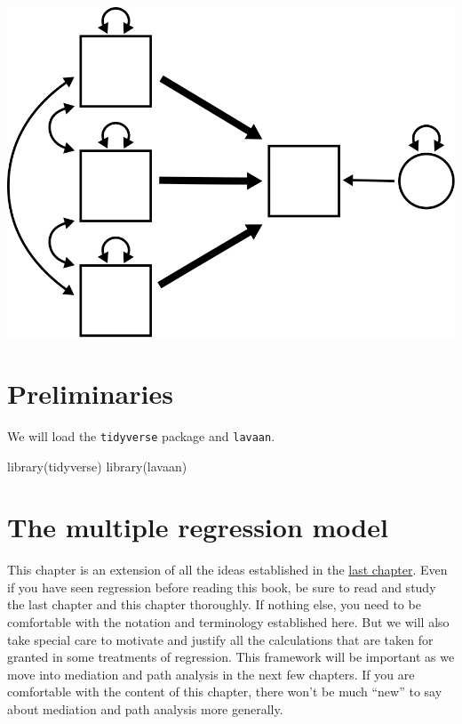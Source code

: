 \documentclass[
]{book}
\newenvironment{Shaded}{\begin{snugshade}}{\end{snugshade}}
\newcommand{\FunctionTok}[1]{\textcolor[rgb]{0.00,0.00,0.00}{#1}}
\newcommand{\NormalTok}[1]{#1}
\begin{document}
\begin{center}\includegraphics{graphics/multiple_regression} \end{center}

\hypertarget{preliminaries-1}{%
\section*{Preliminaries}\label{preliminaries-1}}

We will load the \texttt{tidyverse} package and \texttt{lavaan}.

\begin{Shaded}
\begin{Highlighting}[]
\FunctionTok{library}\NormalTok{(tidyverse)}
\FunctionTok{library}\NormalTok{(lavaan)}
\end{Highlighting}
\end{Shaded}

\hypertarget{multiple-model}{%
\section{The multiple regression model}\label{multiple-model}}

This chapter is an extension of all the ideas established in the \protect\hyperlink{simple}{last chapter}. Even if you have seen regression before reading this book, be sure to read and study the last chapter and this chapter thoroughly. If nothing else, you need to be comfortable with the notation and terminology established here. But we will also take special care to motivate and justify all the calculations that are taken for granted in some treatments of regression. This framework will be important as we move into mediation and path analysis in the next few chapters. If you are comfortable with the content of this chapter, there won't be much ``new'' to say about mediation and path analysis more generally.
\end{document}

